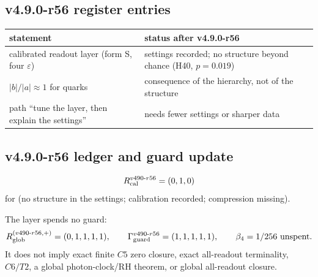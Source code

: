 \subsection*{v4.9.0-r56 register entries}
\label{subsec:v490-r56-register}

\begin{center}
\small
\begin{tabular}{@{}>{\raggedright\arraybackslash}p{}>{\raggedright\arraybackslash}p{}@{}}
\toprule
statement & status after v4.9.0-r56\\
\midrule
calibrated readout layer (form S, four \(\varepsilon\)) & settings recorded; no structure beyond chance (H40, \(p=0.019\))\\
\(|b|/|a|\approx1\) for quarks & consequence of the hierarchy, not of the structure\\
path ``tune the layer, then explain the settings'' & needs fewer settings or sharper data\\
\bottomrule
\end{tabular}
\end{center}

\subsection*{v4.9.0-r56 ledger and guard update}
\label{subsec:v490-r56-ledger-guard}

\[
R_{\rm cal}^{v490\text{-}r56}=(0,1,0)
\]
for (no structure in the settings; calibration recorded; compression missing).

The layer spends no guard:
\[
R_{\rm glob}^{(v490\text{-}r56,+)}=(0,1,1,1,1),
\qquad
\Gamma_{\rm guard}^{v490\text{-}r56}=(1,1,1,1,1),
\qquad
\beta_4=1/256\ \text{unspent}.
\]
It does not imply exact finite \(C5\) zero closure, exact all-readout terminality,
\(C6/T2\), a global photon-clock/RH theorem, or global all-readout closure.
